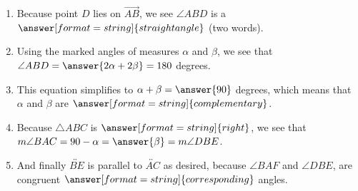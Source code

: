 \documentclass[nooutcomes]{ximera}
\begin{document}
\begin{problem}
\begin{problem}
\begin{problem}
\begin{enumerate}
\item Because point $D$ lies on $\overrightarrow{AB}$, we see $\angle ABD$ is a $\answer[format=string]{straight angle}$ (two words).  
\item Using the marked angles of measures $\alpha$ and $\beta$, we see that $\angle ABD = \answer{2\alpha + 2\beta} = 180$ degrees.  
\item This equation simplifies to $\alpha + \beta = \answer{90}$ degrees, which means that $\alpha$ and $\beta$ are $\answer[format=string]{complementary}$. 
\item Because $\triangle ABC$ is $\answer[format=string]{right}$, we see that $m\angle BAC = 90 - \alpha = \answer{\beta} = m\angle DBE$.
\item And finally $\overleftrightarrow{BE}$ is parallel to  $\overleftrightarrow{AC}$ as desired, because $\angle BAF$ and $\angle DBE$, 
are congruent $\answer[format=string]{corresponding}$ angles.  
\end{enumerate}

\end{problem}
\end{problem}
\end{problem}
\end{document}
